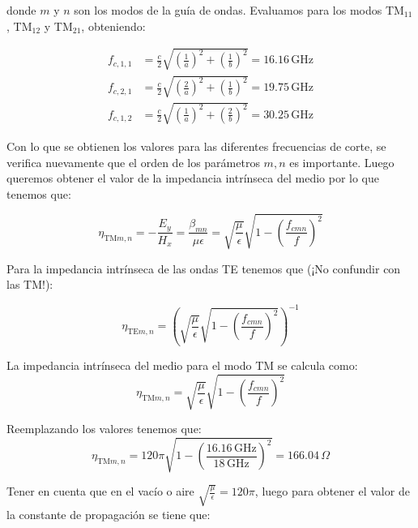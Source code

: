 \documentclass[
  11pt,
  letterpaper,
   addpoints,
   answers
  ]{exam}
\begin{document}
\begin{questions}
\begin{solution}
donde $m$ y $n$ son los modos de la guía de ondas. Evaluamos para los modos TM$_{11}$, TM$_{12}$ y TM$_{21}$, obteniendo:

\begin{align}
    f_{c,1,1} &= \frac{c}{2} \sqrt{\left(\frac{1}{a}\right)^2 + \left(\frac{1}{b}\right)^2} = 16.16\,\text{GHz} \tag{72} \\
    f_{c,2,1} &= \frac{c}{2} \sqrt{\left(\frac{2}{a}\right)^2 + \left(\frac{1}{b}\right)^2} = 19.75\,\text{GHz} \tag{73} \\
    f_{c,1,2} &= \frac{c}{2} \sqrt{\left(\frac{1}{a}\right)^2 + \left(\frac{2}{b}\right)^2} = 30.25\,\text{GHz} \tag{74}
\end{align}

Con lo que se obtienen los valores para las diferentes frecuencias de corte, se verifica nuevamente que el orden de los parámetros $m, n$ es importante. Luego queremos obtener el valor de la impedancia intrínseca del medio por lo que tenemos que:

\begin{equation}
    \eta_{\mathrm{TM}m,n} = -\frac{E_y}{H_x} = \frac{\beta_{mn}}{\mu\epsilon} = \sqrt{\frac{\mu}{\epsilon}} \sqrt{1-\left(\frac{f_{cmn}}{f}\right)^2} \tag{75}
\end{equation}

Para la impedancia intrínseca de las ondas TE tenemos que (¡No confundir con las TM!):

\begin{equation}
    \eta_{\mathrm{TE}m,n} = \left( \sqrt{\frac{\mu}{\epsilon}} \sqrt{1-\left(\frac{f_{cmn}}{f}\right)^2} \right)^{-1} \tag{76}
\end{equation}

La impedancia intrínseca del medio para el modo TM se calcula como:
\begin{equation}
    \eta_{\mathrm{TM}m,n} = \sqrt{\frac{\mu}{\epsilon}} \sqrt{1-\left(\frac{f_{cmn}}{f}\right)^2} \tag{77}
\end{equation}

Reemplazando los valores tenemos que:
\begin{equation}
    \eta_{\mathrm{TM}m,n} = 120\pi \sqrt{1-\left( \frac{16.16\,\mathrm{GHz}}{18\,\mathrm{GHz}} \right)^2} = 166.04\,\Omega \tag{78}
\end{equation}

Tener en cuenta que en el vacío o aire $\sqrt{\frac{\mu}{\epsilon}} = 120\pi$, luego para obtener el valor de la constante de propagación se tiene que:


\end{solution}
\end{questions}
\end{document}
